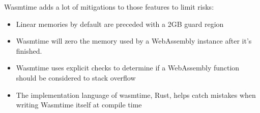 \documentclass[../main.tex]{subfiles}
\begin{document}
Wasmtime adds  a lot of mitigations to those features to limit risks:
\begin{itemize}
  \item Linear memories by default are preceded with a 2GB guard region
  \item Wasmtime will zero the memory used by a WebAssembly instance after it's finished.
  \item Wasmtime uses explicit checks to determine if a WebAssembly function should be considered to stack overflow
  \item The implementation language of wasmtime, Rust, helps catch mistakes when writing Wasmtime itself at compile time
\end{itemize}
\end{document}
